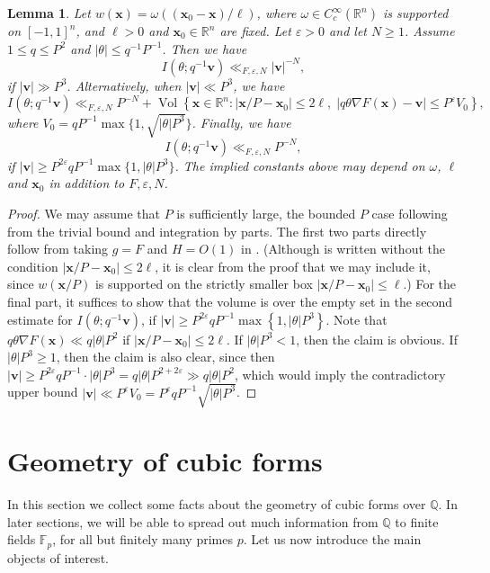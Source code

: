 \documentclass[a4paper,11pt, twoside,reqno]{amsart}
\theoremstyle{plain}
\newtheorem{lemma}[thm]{Lemma}
\theoremstyle{definition}
\theoremstyle{remark}
\newcommand{\bfv}{\bm{v}}
\newcommand{\bfx}{\bm{x}}
\newcommand{\RR}{\mathbb{R}}
\newcommand{\QQ}{\mathbb{Q}}
\DeclareMathOperator{\meas}{Vol}
\newcommand{\ve}{\varepsilon}
\renewcommand{\le}{\leqslant}
\renewcommand{\ge}{\geqslant}
\renewcommand{\geq}{\geqslant}
\newcommand{\FF}{\mathbb{F}}
\numberwithin{equation}{section}
\begin{document}
\begin{lemma}\label{lem:Iq'}
Let $w(\bfx)=\omega((\bm{x}_0-\bfx)/\ell)$, where
$\omega\in C_c^\infty(\RR^n)$ is supported on $[-1,1]^n$,
and $\ell>0$ and $\bm{x}_0\in\RR^n$ are fixed.
Let $\ve>0$ and let $N\geq 1$.
Assume $1\le q\le P^2$ and $|\theta| \le q^{-1}P^{-1}$.
Then we have
$$
I(\theta;q^{-1}\bfv)
\ll_{F,\ve,N} |\bfv|^{-N},
$$
if $|\bfv|\gg P^3$. Alternatively, when
$|\bfv|\ll P^3$, we have
$$
I(\theta;q^{-1}\bfv)
\ll_{F,\ve,N}
P^{-N}+\meas\left\{\bfx\in\RR^n:
|\bfx/P-\bm{x}_0|\le 2\ell,\;
|q\theta\nabla F(\bfx)-\bfv|\le P^\ve V_0
\right\},
$$
where $V_0=qP^{-1}\max\{1,\sqrt{|\theta|P^3}\}$.
Finally, we have
$$
I(\theta;q^{-1}\bfv)
\ll_{F,\ve,N} P^{-N},
$$
if $|\bfv|\ge P^{2\ve}qP^{-1}\max\{1,|\theta|P^3\}$.
The implied constants above may depend on $\omega$, $\ell$ and $\bm{x}_0$
in addition to $F,\ve,N$.
\end{lemma}

\begin{proof}
We may assume that $P$ is sufficiently large, the bounded $P$ case
following from the trivial bound and integration by parts.
The first two parts directly follow from  taking $g=F$ and $H=O(1)$ in
\cite[Lemma~9 and its proof]{41}.
(Although \cite[Lemma~9]{41} is written without the condition $|\bfx/P-\bm{x}_0|\le 2\ell$,
it is clear from the proof that we may include it, since $w(\bfx/P)$
is supported on the strictly smaller box $|\bfx/P-\bm{x}_0|\le \ell$.)
For the final part, it suffices to show that the volume is over the empty  set in the second estimate 
for $I(\theta;q^{-1}\bfv)$,  
if $|\bfv|\geq P^{2\ve} qP^{-1} \max\left\{1,|\theta |P^3\right\}$. 
Note that $q\theta \nabla F(\bfx)\ll q|\theta|P^2$ if $|\bfx/P-\bm{x}_0|\le 2\ell$.  If 
$|\theta |P^3<1$, then the claim is obvious.  
If $|\theta |P^3\geq 1$, then the claim is also clear, since  then 
$|\bfv|\geq P^{2\ve} qP^{-1}\cdot |\theta |P^3=q |\theta |P^{2+2\ve}\gg q |\theta |P^{2}$, which would imply the contradictory upper bound
$|\bfv|\ll P^\ve V_0 = P^\ve  qP^{-1} \sqrt{|\theta |P^3}$.
\end{proof}


\section{Geometry of cubic forms}
\label{sec : geom_cubic_hyper}

In this section we collect some facts about the geometry of cubic forms over $\QQ$.
In later sections, we will be able to spread out much information from $\QQ$
to finite fields $\FF_p$,
for all but finitely many primes $p$.
Let us now introduce the main objects of interest.
\end{document}
